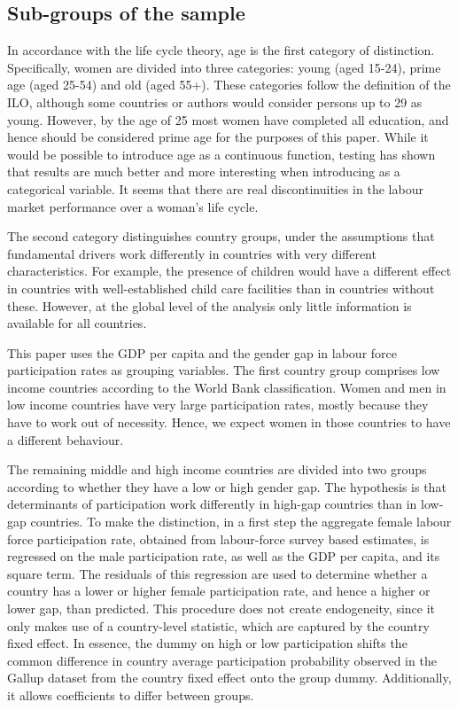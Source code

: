 \subsection{Sub-groups of the sample}
In accordance with the life cycle theory, age is the first category of distinction. Specifically, women are divided into three categories: young (aged 15-24), prime age (aged 25-54) and old (aged 55+). These categories follow the definition of the ILO, although some countries or authors would consider persons up to 29 as young. However, by the age of 25 most women have completed all education, and hence should be considered prime age for the purposes of this paper. While it would be possible to introduce age as a continuous function, testing has shown that results are much better and more interesting when introducing as a categorical variable. It seems that there are real discontinuities in the labour market performance over a woman's life cycle.

The second category distinguishes country groups, under the assumptions that fundamental drivers work differently in countries with very different characteristics. For example, the presence of children would have a different effect in countries with well-established child care facilities than in countries without these. However, at the global level of the analysis only little information is available for all countries. 

This paper uses the GDP per capita and the gender gap in labour force participation rates as grouping variables. The first country group comprises low income countries according to the World Bank classification. Women and men in low income countries have very large participation rates, mostly because they have to work out of necessity. Hence, we expect women in those countries to have a different behaviour. 

The remaining middle and high income countries are divided into two groups according to whether they have a low or high gender gap. The hypothesis is that determinants of participation work differently in high-gap countries than in low-gap countries. To make the distinction, in a first step the aggregate female labour force participation rate, obtained from labour-force survey based estimates, is regressed on the male participation rate, as well as the GDP per capita, and its square term. The residuals of this regression are used to determine whether a country has a lower or higher female participation rate, and hence a higher or lower gap, than predicted. This procedure does not create endogeneity, since it only makes use of a country-level statistic, which are captured by the country fixed effect. In essence, the dummy on high or low participation shifts the common difference in country average participation probability observed in the Gallup dataset from the country fixed effect onto the group dummy. Additionally, it allows coefficients to differ between groups.

